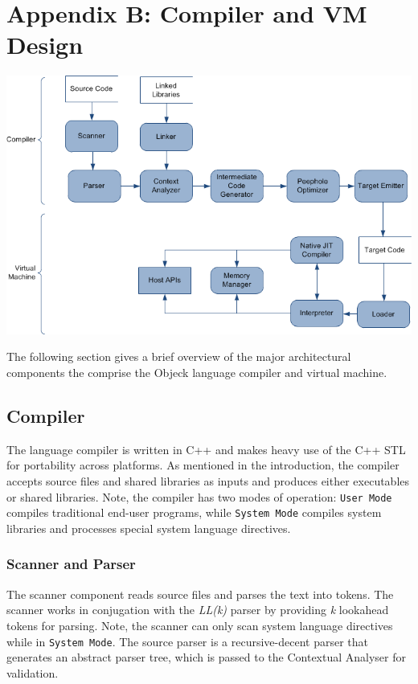 \documentclass[12pt]{article}
\begin{document}
\section{Appendix B: Compiler and VM Design}
\includegraphics[scale=0.60]{../../images/compiler_data_flow.png}

The following section gives a brief overview of the major architectural components the comprise the Objeck language compiler and virtual machine.

\subsection{Compiler}
The language compiler is written in C++ and makes heavy use of the C++ STL for portability across platforms.  As mentioned in the introduction, the compiler accepts source files and shared libraries as inputs and produces either executables or shared libraries.  Note, the compiler has two modes of operation: \texttt{User Mode} compiles traditional end-user programs, while \texttt{System Mode} compiles system libraries and processes special system language directives.

\subsubsection{Scanner and Parser}
The scanner component reads source files and parses the text into tokens.  The scanner works in conjugation with the \emph{LL(k)} parser by providing \emph{k} lookahead tokens for parsing.  Note, the scanner can only scan system language directives while in \texttt{System Mode}.  The source parser is a recursive-decent parser that generates an abstract parser tree, which is passed to the Contextual Analyser for validation.
\end{document}
